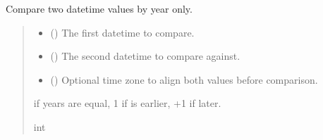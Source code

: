 \documentclass[letterpaper,10pt,english]{sphinxmanual}
\begin{document}
\begin{fulllineitems}

\begin{fulllineitems}
\label{\detokenize{apache_commons_validator_python.routines:apache_commons_validator_python.routines.date_validator.DateValidator.compare_years}}
\pysigstartsignatures
{}
\pysigstopsignatures
\sphinxAtStartPar
Compare two datetime values by year only.
\begin{quote}\begin{description}
\begin{itemize}
\item {} 
\sphinxAtStartPar
{} () \textendash{} The first datetime to compare.

\item {} 
\sphinxAtStartPar
{} () \textendash{} The second datetime to compare against.

\item {} 
\sphinxAtStartPar
{} (\sphinxstyleliteralemphasis{\sphinxupquote{{[}}}\sphinxstyleliteralemphasis{\sphinxupquote{{]}}}) \textendash{} Optional time zone to align both values before comparison.

\end{itemize}

 if years are equal, \sphinxhyphen{}1 if  is earlier, +1 if later.

\sphinxAtStartPar
int

\end{description}\end{quote}


\end{fulllineitems}
\end{fulllineitems}
\end{document}
